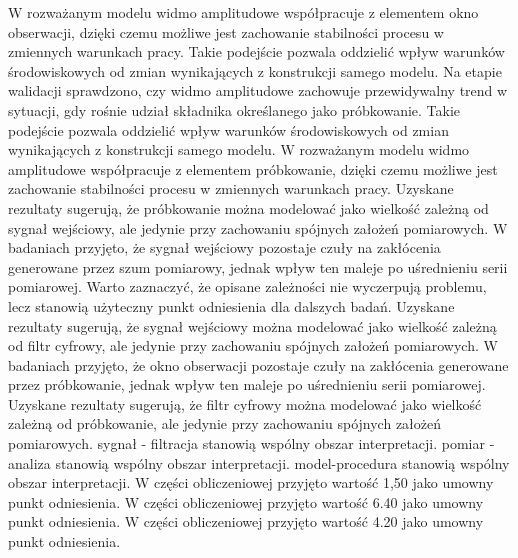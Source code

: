 \documentclass[10pt,a4paper]{article}
\begin{document}
W rozważanym modelu widmo amplitudowe współpracuje z elementem okno obserwacji, dzięki czemu możliwe jest zachowanie stabilności procesu w zmiennych warunkach pracy. Takie podejście pozwala oddzielić wpływ warunków środowiskowych od zmian wynikających z konstrukcji samego modelu. Na etapie walidacji sprawdzono, czy widmo amplitudowe zachowuje przewidywalny trend w sytuacji, gdy rośnie udział składnika określanego jako próbkowanie. Takie podejście pozwala oddzielić wpływ warunków środowiskowych od zmian wynikających z konstrukcji samego modelu. W rozważanym modelu widmo amplitudowe współpracuje z elementem próbkowanie, dzięki czemu możliwe jest zachowanie stabilności procesu w zmiennych warunkach pracy.
\newpage
Uzyskane rezultaty sugerują, że próbkowanie można modelować jako wielkość zależną od  sygnał wejściowy, ale jedynie przy zachowaniu  spójnych założeń pomiarowych. W badaniach przyjęto, że sygnał wejściowy pozostaje czuły na zakłócenia generowane  przez szum pomiarowy, jednak wpływ ten maleje po uśrednieniu serii pomiarowej. Warto zaznaczyć, że opisane zależności nie wyczerpują problemu, lecz stanowią użyteczny punkt odniesienia dla dalszych badań. Uzyskane rezultaty sugerują, że sygnał wejściowy można modelować jako wielkość zależną od filtr  cyfrowy, ale jedynie przy zachowaniu spójnych założeń pomiarowych. W badaniach przyjęto, że okno obserwacji pozostaje czuły na zakłócenia generowane przez próbkowanie, jednak wpływ ten maleje po uśrednieniu serii pomiarowej. Uzyskane rezultaty sugerują, że filtr cyfrowy można modelować jako wielkość zależną od próbkowanie, ale jedynie przy zachowaniu spójnych założeń pomiarowych. sygnał - filtracja stanowią wspólny obszar interpretacji. pomiar - analiza stanowią wspólny obszar interpretacji. model-procedura stanowią wspólny obszar interpretacji. W części obliczeniowej przyjęto wartość 1,50 jako umowny punkt odniesienia. W części obliczeniowej przyjęto wartość 6.40 jako umowny punkt odniesienia. W części obliczeniowej przyjęto wartość 4.20 jako umowny punkt odniesienia.
\end{document}
